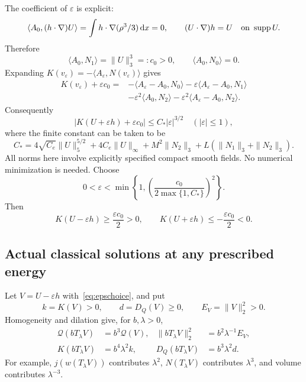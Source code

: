 \documentclass[11pt,a4paper]{article}
\theoremstyle{definition}
\newcommand{\Q}{\mathcal Q}
\newcommand{\dd}{\,\mathrm dx}
\newcommand{\eps}{\varepsilon}
\newcommand{\ip}[2]{\langle #1,#2\rangle}
\DeclareMathOperator{\supp}{supp}
\begin{document}
The coefficient of $\eps$ is explicit:
\[
 \ip{A_0}{(h\cdot\nabla)U}
 =\int h\cdot\nabla(\rho^3/3)\dd=0,
 \qquad (U\cdot\nabla)h=U\quad\hbox{on }\supp U.
\]
Therefore
\begin{equation}\label{eq:c0}
 \ip{A_0}{N_1}=\|U\|_3^3=:c_0>0,
 \qquad \ip{A_0}{N_0}=0.
\end{equation}
Expanding $K(v_\eps)=-\ip{A_\eps}{N(v_\eps)}$ gives
\begin{align*}
 K(v_\eps)+\eps c_0
 ={}&-\ip{A_\eps-A_0}{N_0}
     -\eps\ip{A_\eps-A_0}{N_1}\\
    &-\eps^2\ip{A_0}{N_2}
     -\eps^2\ip{A_\eps-A_0}{N_2}.
\end{align*}
Consequently
\begin{equation}\label{eq:hf20sign}
 \boxed{\quad |K(U+\eps h)+\eps c_0|\le C_*|\eps|^{3/2}
 \quad(|\eps|\le1),\quad}
\end{equation}
where the finite constant can be taken to be
\begin{equation}\label{eq:Cstar}
 C_*=4\sqrt{C_e}\|U\|_5^{5/2}+4C_e\|U\|_\infty
      +M^2\|N_2\|_3+L(\|N_1\|_3+\|N_2\|_3).
\end{equation}
All norms here involve explicitly specified compact smooth fields. No numerical minimization is needed. Choose
\begin{equation}\label{eq:epschoice}
 0<\eps<\min\left\{1,
 \left(\frac{c_0}{2\max\{1,C_*\}}\right)^2\right\}.
\end{equation}
Then
\begin{equation}\label{eq:twosigns}
 K(U-\eps h)\ge\frac{\eps c_0}{2}>0,
 \qquad K(U+\eps h)\le-\frac{\eps c_0}{2}<0.
\end{equation}

\subsection{Actual classical solutions at any prescribed energy}
Let $V=U-\eps h$ with~\eqref{eq:epschoice}, and put
\[
 k=K(V)>0,\qquad d=D_Q(V)\ge0,\qquad E_V=\|V\|_2^2>0.
\]
Homogeneity and dilation give, for $b,\lambda>0$,
\begin{equation}\label{eq:scaling-table}
 \begin{aligned}
 \Q(bT_\lambda V)&=b^3\Q(V),&
 \|bT_\lambda V\|_2^2&=b^2\lambda^{-1}E_V,\\
 K(bT_\lambda V)&=b^4\lambda^2k,&
 D_Q(bT_\lambda V)&=b^3\lambda^2d.
 \end{aligned}
\end{equation}
For example, $j(w(T_\lambda V))$ contributes $\lambda^2$, $N(T_\lambda V)$ contributes $\lambda^3$, and volume contributes $\lambda^{-3}$.
\end{document}
